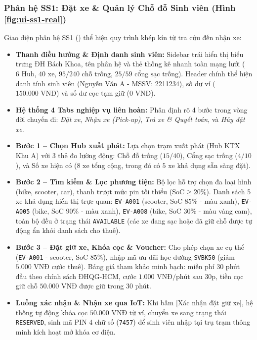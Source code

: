 \documentclass[12pt,a4paper]{article}
\begin{document}
\subsubsection{Phân hệ SS1: Đặt xe \& Quản lý Chỗ đỗ Sinh viên (Hình \ref{fig:ui-ss1-real})}
Giao diện phân hệ SS1 () thể hiện quy trình khép kín từ tra cứu đến nhận xe:
\begin{itemize}[nosep]
    \item \textbf{Thanh điều hướng \& Định danh sinh viên:} Sidebar trái hiển thị biểu trưng ĐH Bách Khoa, tên phân hệ và thẻ thống kê nhanh toàn mạng lưới ($6\text{ Hub}$, $40\text{ xe}$, $95/240\text{ chỗ trống}$, $25/59\text{ cổng sạc trống}$). Header chính thể hiện danh tính sinh viên (Nguyễn Văn A - MSSV: 2211234), số dư ví ($150.000\text{ VNĐ}$) và số dư cọc tạm giữ ($0\text{ VNĐ}$).
    \item \textbf{Hệ thống 4 Tabs nghiệp vụ liên hoàn:} Phân định rõ 4 bước trong vòng đời chuyến đi: \textit{Đặt xe}, \textit{Nhận xe (Pick-up)}, \textit{Trả xe \& Quyết toán}, và \textit{Hủy đặt xe}.
    \item \textbf{Bước 1 -- Chọn Hub xuất phát:} Lựa chọn trạm xuất phát (Hub KTX Khu A) với 3 thẻ đo lường động: Chỗ đỗ trống ($15/40$), Cổng sạc trống ($4/10$), và Số xe hiện có ($8\text{ xe}$ tổng cộng, trong đó có $5\text{ xe khả dụng}$ sẵn sàng đặt).
    \item \textbf{Bước 2 -- Tìm kiếm \& Lọc phương tiện:} Bộ lọc hỗ trợ chọn đa loại hình (bike, scooter, car), thanh trượt mức pin tối thiểu ($\text{SoC} \ge 20\%$). Danh sách 5 xe khả dụng hiển thị trực quan: \texttt{EV-A001} (scooter, SoC $85\%$ - màu xanh), \texttt{EV-A005} (bike, SoC $90\%$ - màu xanh), \texttt{EV-A008} (bike, SoC $30\%$ - màu vàng cam), toàn bộ đều ở trạng thái \texttt{AVAILABLE} (các xe đang sạc hoặc đã giữ chỗ được tự động ẩn khỏi danh sách cho thuê).
    \item \textbf{Bước 3 -- Đặt giữ xe, Khóa cọc \& Voucher:} Cho phép chọn xe cụ thể (\texttt{EV-A001} - scooter, SoC $85\%$), nhập mã ưu đãi học đường \texttt{SVBK50} (giảm $5.000\text{ VNĐ}$ cước thuê). Bảng giá tham khảo minh bạch: miễn phí 30 phút đầu theo chính sách ĐHQG-HCM, cước $1.000\text{ VNĐ/phút}$ sau 30p, tiền cọc giữ chỗ $50.000\text{ VNĐ}$ được giữ trong 30 phút.
    \item \textbf{Luồng xác nhận \& Nhận xe qua IoT:} Khi bấm [Xác nhận đặt giữ xe], hệ thống tự động khóa cọc $50.000\text{ VNĐ}$ từ ví, chuyển xe sang trạng thái \texttt{RESERVED}, sinh mã PIN 4 chữ số (\texttt{7457}) để sinh viên nhập tại trụ trạm thông minh kích hoạt mở khóa cơ điện.
\end{itemize}
\end{document}
